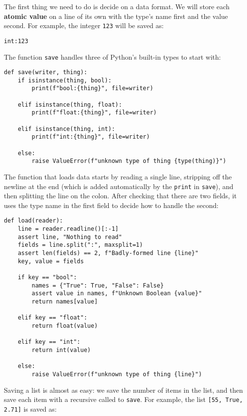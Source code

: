 \documentclass{scrbook}
\newcommand{\glossref}[1]{\textbf{#1}}
\begin{document}
The first thing we need to do is decide on a data format.
We will store each \glossref{atomic value} on a line of its own
with the type's name first and the value second.
For example,
the integer \texttt{123} will be saved as:

\begin{lstlisting}[frame=single,frameround=tttt]
int:123
\end{lstlisting}


The function \texttt{save} handles three of Python's built-in types to start with:


\begin{lstlisting}[frame=single,frameround=tttt]
def save(writer, thing):
    if isinstance(thing, bool):
        print(f"bool:{thing}", file=writer)

    elif isinstance(thing, float):
        print(f"float:{thing}", file=writer)

    elif isinstance(thing, int):
        print(f"int:{thing}", file=writer)

    else:
        raise ValueError(f"unknown type of thing {type(thing)}")
\end{lstlisting}



The function that loads data starts by reading a single line,
stripping off the newline at the end
(which is added automatically by the \texttt{print} in \texttt{save}),
and then splitting the line on the colon.
After checking that there are two fields,
it uses the type name in the first field
to decide how to handle the second:


\begin{lstlisting}[frame=single,frameround=tttt]
def load(reader):
    line = reader.readline()[:-1]
    assert line, "Nothing to read"
    fields = line.split(":", maxsplit=1)
    assert len(fields) == 2, f"Badly-formed line {line}"
    key, value = fields

    if key == "bool":
        names = {"True": True, "False": False}
        assert value in names, f"Unknown Boolean {value}"
        return names[value]

    elif key == "float":
        return float(value)

    elif key == "int":
        return int(value)

    else:
        raise ValueError(f"unknown type of thing {line}")
\end{lstlisting}



Saving a list is almost as easy:
we save the number of items in the list,
and then save each item with a recursive called to \texttt{save}.
For example,
the list \texttt{[55, True, 2.71]} is saved as:
\end{document}

